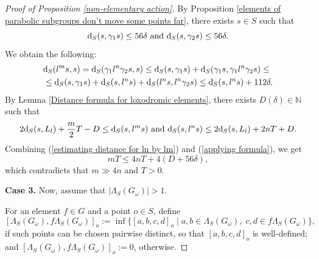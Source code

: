 \documentclass[11pt,letterpaper]{article}
\newcommand{\NN}{\mathbb{N}}
\renewcommand{\d}{{\rm d}}
\renewcommand{\d}{{\rm d}}
\theoremstyle{definition}
\theoremstyle{remark}
\newtheorem{rem}[thm]{Remark}
\begin{document}
\begin{proof}[Proof of Proposition \ref{non-elementary action}]
By Proposition \ref{elements of parabolic subgroups don't move some points far}, there exists $s \in S$ such that 
$$
\d_S(s, \gamma_1s) \leq 56\delta \text{ and } \d_S(s, \gamma_2s) \leq 56\delta.
$$
We obtain the following: 
\begin{equation}\label{estimating distance for ln by lm}
\begin{aligned}
    &\d_S(l^ms,s)=\d_S(\gamma_1l^n\gamma_2s,s)\leq \d_S(s, \gamma_1s)+\d_S(\gamma_1s,\gamma_1l^n\gamma_2s)\leq\\
    &\leq \d_S(s, \gamma_1s)+\d_S(s,l^ns)+\d_S(l^ns, l^n\gamma_2s) \leq \d_S(s,l^ns) + 112\delta.
\end{aligned}
\end{equation}
By Lemma \ref{Distance formula for loxodromic elements}, there exists $D(\delta) \in \NN$ such that 
\begin{equation}\label{applying formula}
2\d_S(s, L_l)+\frac{m}{2}T - D \leq \d_S(s, l^ms) \text{ and } \d_S(s, l^ns)\leq 2\d_S(s, L_l)+2nT + D.
\end{equation}
Combining (\ref{estimating distance for ln by lm}) and (\ref{applying formula}), we get
$$
mT \leq 4nT+4(D+56\delta),
$$
which contradicts that $m \gg 4n$ and $T>0$.

{\bf Case 3.} Now, assume that $|\Lambda_S(G_\omega)| > 1$. 

For an element $f \in G$ and a point $o \in S$, define
$$
[\Lambda_S(G_\omega), f\Lambda_S(G_\omega)]_o:= \inf \{ [a,b,c,d]_o \mid a,b \in \Lambda_S(G_\omega), \;  c,d \in f\Lambda_S(G_\omega) \},
$$
if such points can be chosen pairwise distinct, so that $[a,b,c,d]_o$ is well-defined; and $[\Lambda_S(G_\omega), f\Lambda_S(G_\omega)]_o:=0$, otherwise.




\end{proof}
\end{document}
